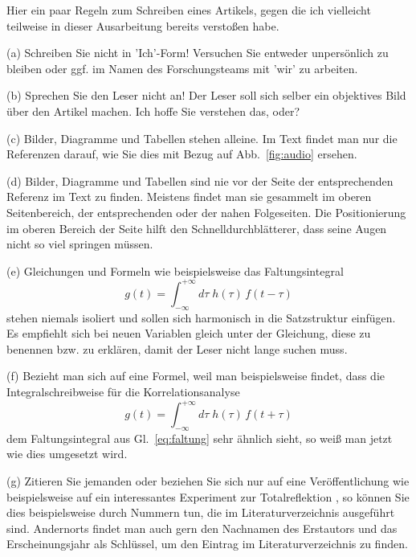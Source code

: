 \documentclass[10pt,twocolumn]{scrartcl}
\begin{document}
Hier ein paar Regeln zum Schreiben eines Artikels, 
gegen die ich vielleicht teilweise in dieser Ausarbeitung bereits
verstoßen habe.
\begin{list}{-}{}
\item[(a)] Schreiben Sie nicht in 'Ich'-Form! Versuchen Sie entweder 
unpersönlich zu bleiben oder ggf. im Namen des Forschungsteams mit 'wir' zu arbeiten.

\item[(b)] Sprechen Sie den Leser nicht an! Der Leser soll sich selber ein
objektives Bild über den Artikel machen. Ich hoffe Sie verstehen das, oder?

\item[(c)] Bilder, Diagramme und Tabellen stehen alleine. Im Text findet man
nur die Referenzen darauf, wie Sie dies mit Bezug auf
Abb.~\ref{fig:audio} ersehen.
\item[(d)] Bilder, Diagramme und Tabellen sind nie vor der Seite der entsprechenden 
Referenz im Text zu finden. Meistens findet man sie gesammelt im oberen
Seitenbereich, der entsprechenden oder der nahen Folgeseiten. Die Positionierung
im oberen Bereich der Seite hilft den Schnelldurchblätterer, dass seine 
Augen nicht so viel springen müssen.
\item[(e)] Gleichungen und Formeln wie beispielsweise das Faltungsintegral
\begin{equation}
g(t) = \int_{-\infty}^{+\infty}\!\!d\tau \; h(\tau) \, f(t-\tau)
\label{eq:faltung}
\end{equation}
stehen niemals isoliert und sollen sich harmonisch in die Satzstruktur einfügen.
Es empfiehlt sich bei neuen Variablen gleich unter der Gleichung, diese
zu benennen bzw. zu erklären, damit der Leser nicht lange suchen muss.
\item[(f)] Bezieht man sich auf eine Formel, weil man beispielsweise findet,
dass die Integralschreibweise für die Korrelationsanalyse 
\begin{equation}
g(t) = \int_{-\infty}^{+\infty}\!\!d\tau \; h(\tau) \, f(t + \tau)
\end{equation}
dem Faltungsintegral aus Gl.~\eqref{eq:faltung} sehr ähnlich sieht,
so weiß man jetzt wie dies umgesetzt wird.
\item[(g)] Zitieren Sie jemanden oder beziehen Sie sich nur auf eine
Veröffentlichung wie beispielsweise auf ein interessantes Experiment 
zur Totalreflektion \cite{Goos1947}, so können Sie dies beispielsweise 
durch Nummern tun, die im Literaturverzeichnis ausgeführt sind.
Andernorts findet man auch gern den Nachnamen des Erstautors und
das Erscheinungsjahr als Schlüssel, um den Eintrag im Literaturverzeichnis
zu finden. 


\end{list}
\end{document}
